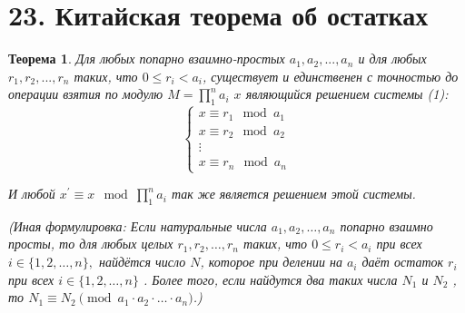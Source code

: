\documentclass[a4paper,12pt]{article}
\newtheorem*{theorem}{Теорема}
\begin{document}
        \section*{23. Китайская теорема об остатках}
        \begin{theorem}
            Для любых попарно взаимно-простых $a_1, a_2, ..., a_n$ и для любых $r_1, r_2, ..., r_n$ таких, что $0 \leqslant r_i < a_i$, существует и единственен с точностью до операции взятия по модулю $M = \prod_{1}^{n} a_i$ $x$ являющийся решением системы (1):
            \begin{equation*}
                   \begin{cases}
                   x \equiv r_1 \mod a_1 \\
                   x \equiv r_2 \mod a_2 \\
                   \vdots
                   \\
                   x \equiv r_n \mod a_n
                   \end{cases}
            \end{equation*}

            И любой $x^\prime \equiv x \mod \prod_{1}^{n} a_i$ так же является решением этой системы.

            (Иная формулировка: Если натуральные числа $ a_{1},a_{2},\dots ,a_{n}$
            попарно взаимно просты, то для любых целых $ r_{1},r_{2},\dots ,r_{n}$ таких, что
            $ 0\leqslant r_{i}<a_{i}$  при всех $ i\in \{1,2,\dots ,n\},$  найдётся число $N$,
            которое при делении на $ a_{i}$  даёт остаток $ r_{i}$  при всех $ i\in \{1,2,\dots ,n\}$ . Более того, если найдутся два таких числа $N_{1}$  и $N_{2}$ , то
            $N_1 \equiv N_2 \pmod{a_1\cdot a_2\cdot \ldots\cdot a_n}$.)
        \end{theorem}
\end{document}
